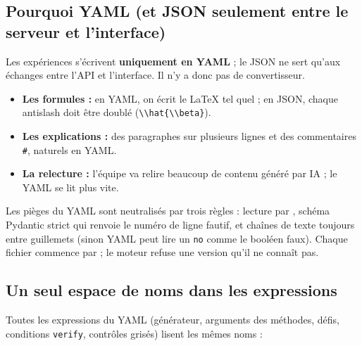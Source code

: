 \documentclass[11pt,a4paper]{article}
\begin{document}
\subsection{Pourquoi YAML (et JSON seulement entre le serveur et l'interface)}
Les expériences s'écrivent \textbf{uniquement en YAML} ; le JSON ne sert qu'aux échanges entre l'API et l'interface. Il n'y a donc pas de convertisseur.
\begin{itemize}[leftmargin=*, nosep]
  \item \textbf{Les formules :} en YAML, on écrit le LaTeX tel quel ; en JSON, chaque antislash doit être doublé (\texttt{\textbackslash\textbackslash hat\{\textbackslash\textbackslash beta\}}).
  \item \textbf{Les explications :} des paragraphes sur plusieurs lignes et des commentaires \texttt{\#}, naturels en YAML.
  \item \textbf{La relecture :} l'équipe va relire beaucoup de contenu généré par IA ; le YAML se lit plus vite.
\end{itemize}
Les pièges du YAML sont neutralisés par trois règles : lecture par , schéma Pydantic strict qui renvoie le numéro de ligne fautif, et chaînes de texte toujours entre guillemets (sinon YAML peut lire un \texttt{no} comme le booléen faux). Chaque fichier commence par  ; le moteur refuse une version qu'il ne connaît pas.

\subsection{Un seul espace de noms dans les expressions}
Toutes les expressions du YAML (générateur, arguments des méthodes, défis, conditions \texttt{verify}, contrôles grisés) lisent les mêmes noms :
\end{document}

